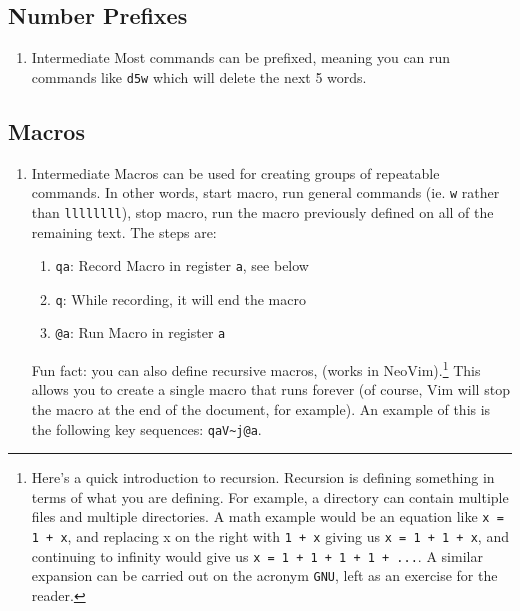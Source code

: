 \documentclass[11pt]{article}
\begin{document}
\subsection{Number Prefixes}
\label{sec:orgc4218c0}
\begin{enumerate}
\item Intermediate
\label{sec:orgf113830}
Most commands can be prefixed, meaning you can run commands like \texttt{d5w} which
will delete the next 5 words.
\end{enumerate}
\subsection{Macros}
\label{sec:org041cce1}
\begin{enumerate}
\item Intermediate
\label{sec:orgbe8fcb3}
Macros can be used for creating groups of repeatable commands. In other words,
start macro, run general commands (ie. \texttt{w} rather than \texttt{llllllll}), stop macro,
run the macro previously defined on all of the remaining text. The steps are:

\begin{enumerate}
\item \texttt{qa}: Record Macro in register \texttt{a}, see below
\item \texttt{q}: While recording, it will end the macro
\item \texttt{@a}: Run Macro in register \texttt{a}
\end{enumerate}

Fun fact: you can also define recursive macros, (works in NeoVim).\footnote{Here's a quick introduction to recursion. Recursion is defining something
in terms of what you are defining. For example, a directory can contain multiple
files and multiple directories. A math example would be an equation like \texttt{x =
1 + x}, and replacing x on the right with \texttt{1 + x} giving us \texttt{x = 1 + 1 + x}, and
continuing to infinity would give us \texttt{x = 1 + 1 + 1 + 1 + ...}. A similar
expansion can be carried out on the acronym \texttt{GNU}, left as an exercise for the
reader.} This
allows you to create a single macro that runs forever (of course, Vim will stop
the macro at the end of the document, for example). An example of this is the 
following key sequences: \texttt{qaV\textasciitilde{}j@a}.
\end{enumerate}
\end{document}
